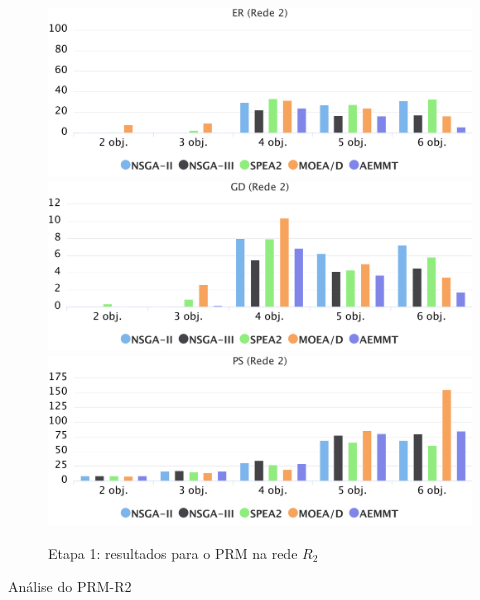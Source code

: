 \begin{figure}[!htbp]
	\caption{Etapa 1: resultados para o PRM na rede $R_2$}
	\label{fig_exp1_mrp_r2}
	\includegraphics[width=1\textwidth]{cap_experimentos/figs/etapa1/er-mrp-r2}
	\includegraphics[width=1\textwidth]{cap_experimentos/figs/etapa1/gd-mrp-r2}
	\includegraphics[width=1\textwidth]{cap_experimentos/figs/etapa1/ps-mrp-r2}
\end{figure}

Análise do PRM-R2

